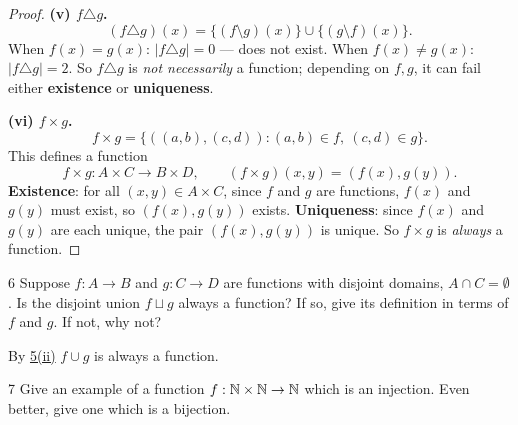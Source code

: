 \begin{solbox}
\begin{proof}
    \medskip
    \textbf{(v) $f\triangle g$.}
    \[
        (f\triangle g)(x) = \{(f\setminus g)(x)\}
        \cup \{(g\setminus f)(x)\}.
    \]
    When $f(x)=g(x)$: $|f\triangle g|=0$ --- does not exist.
    When $f(x)\ne g(x)$: $|f\triangle g|=2$. So $f\triangle g$ is
    \emph{not necessarily} a function; depending on $f,g$, it can
    fail either \textbf{existence} or \textbf{uniqueness}.

    \medskip
    \textbf{(vi) $f\times g$.}
    \[
        f\times g = \{((a,b),(c,d)) : (a,b)\in f,\ (c,d)\in g\}.
    \]
    This defines a function
    \[
        f\times g : A\times C \to B\times D, \qquad
        (f\times g)(x,y) = (f(x), g(y)).
    \]
    \textbf{Existence}: for all $(x,y)\in A\times C$, since $f$ and
    $g$ are functions, $f(x)$ and $g(y)$ must exist, so
    $(f(x),g(y))$ exists.
    \textbf{Uniqueness}: since $f(x)$ and $g(y)$ are each unique,
    the pair $(f(x),g(y))$ is unique.
    So $f\times g$ is \emph{always} a function.
\end{proof}
\end{solbox}

\begin{exercise}{6}
    Suppose $f:A\to B$ and $g:C\to D$ are functions with disjoint domains,
    $A\cap C=\emptyset$. Is the disjoint union $f\sqcup g$ always a function? If
    so, give its definition in terms of $f$ and $g$. If not, why not?
\end{exercise}
\begin{solbox}
\begin{solution}
    By \hyperref[5ii]{5(ii)} $f \cup g $ is always a function.
\end{solution}
\end{solbox}

\begin{exercise}{7}
    Give an example of a function $f:\mathbb{N}\times\mathbb{N}\to\mathbb{N}$ which is an injection.
    Even better, give one which is a bijection.
\end{exercise}

